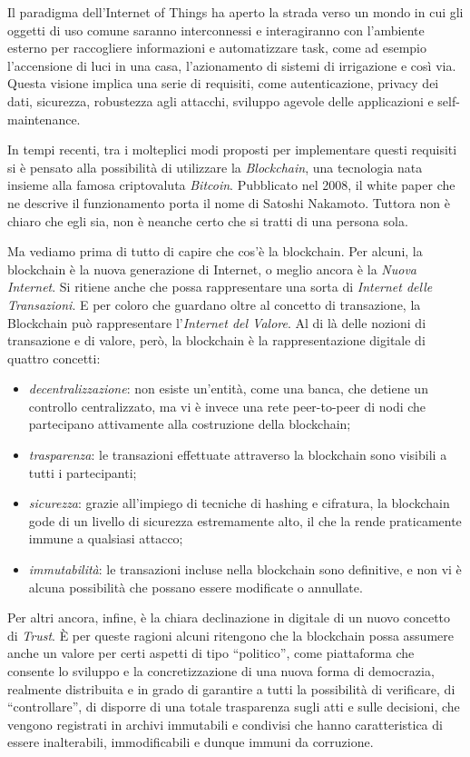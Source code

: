 Il paradigma dell'Internet of Things ha aperto la strada verso un mondo in cui gli oggetti di uso comune saranno interconnessi e interagiranno con l'ambiente esterno per raccogliere informazioni e automatizzare task, come ad esempio l'accensione di luci in una casa, l'azionamento di sistemi di irrigazione e così via. Questa visione implica una serie di requisiti, come autenticazione, privacy dei dati, sicurezza, robustezza agli attacchi, sviluppo agevole delle applicazioni e self-maintenance\cite{Fernandez-Carames2018}.

In tempi recenti, tra i molteplici modi proposti per implementare questi requisiti si è pensato alla possibilità di utilizzare la \textit{Blockchain}, una tecnologia nata insieme alla famosa criptovaluta \textit{Bitcoin}. 
Pubblicato nel 2008, il white paper che ne descrive il funzionamento porta il nome di Satoshi Nakamoto\cite{Nakamoto2008}. Tuttora non è chiaro che egli sia, non è neanche certo che si tratti di una persona sola.

Ma vediamo prima di tutto di capire che cos’è la blockchain. Per alcuni, la blockchain è la nuova generazione di Internet, o meglio ancora è la \textit{Nuova Internet}. Si ritiene anche che possa rappresentare una sorta di \textit{Internet delle Transazioni}. E per coloro che guardano oltre al concetto di transazione, la Blockchain può rappresentare l'\textit{Internet del Valore}. Al di là delle nozioni di transazione e di valore, però, la blockchain è la rappresentazione digitale di quattro concetti:
\begin{itemize}
    \item \textit{decentralizzazione}: non esiste un'entità, come una banca, che detiene un controllo centralizzato, ma vi è invece una rete peer-to-peer di nodi che partecipano attivamente alla costruzione della blockchain;
    \item \textit{trasparenza}: le transazioni effettuate attraverso la blockchain sono visibili a tutti i partecipanti;
    \item \textit{sicurezza}: grazie all'impiego di tecniche di hashing e cifratura, la blockchain gode di un livello di sicurezza estremamente alto, il che la rende praticamente immune a qualsiasi attacco;
    \item \textit{immutabilità}: le transazioni incluse nella blockchain sono definitive, e non vi è alcuna possibilità che possano essere modificate o annullate.
\end{itemize}

Per altri ancora, infine, è la chiara declinazione in digitale di un nuovo concetto di \textit{Trust}. \`E per queste ragioni alcuni ritengono che la blockchain possa assumere anche un valore per certi aspetti di tipo “politico”, come piattaforma che consente lo sviluppo e la concretizzazione di una nuova forma di democrazia, realmente distribuita e in grado di garantire a tutti la possibilità di verificare, di “controllare”, di disporre di una totale trasparenza sugli atti e sulle decisioni, che vengono registrati in archivi immutabili e condivisi che hanno caratteristica di essere inalterabili, immodificabili e dunque immuni da corruzione.

